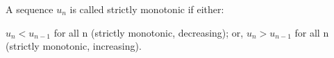 A sequence $u_{n}$  is called strictly monotonic if either:
\par
 $ u_{n} < u_{n-1} $ for all n 
(strictly monotonic, decreasing);
 or, $ u_{n} > u_{n-1} $ for all n
(strictly monotonic, increasing).